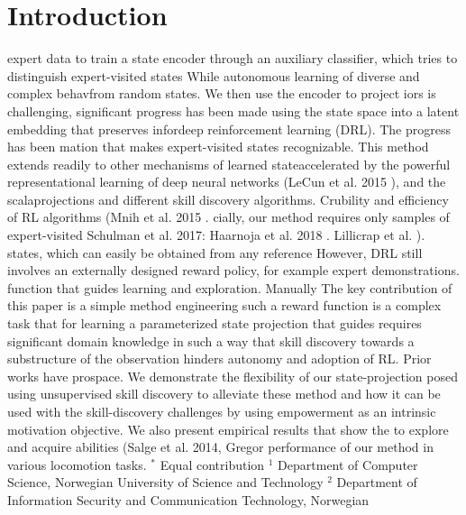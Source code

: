 \section{Introduction} expert data to train a state encoder through an auxiliary classifier, which tries to distinguish expert-visited states While autonomous learning of diverse and complex behavfrom random states. We then use the encoder to project iors is challenging, significant progress has been made using the state space into a latent embedding that preserves infordeep reinforcement learning (DRL). The progress has been mation that makes expert-visited states recognizable. This method extends readily to other mechanisms of learned stateaccelerated by the powerful representational learning of deep neural networks (LeCun et al. 2015 ), and the scalaprojections and different skill discovery algorithms. Crubility and efficiency of RL algorithms (Mnih et al. 2015 . cially, our method requires only samples of expert-visited Schulman et al. 2017: Haarnoja et al. 2018 . Lillicrap et al. ). states, which can easily be obtained from any reference However, DRL still involves an externally designed reward policy, for example expert demonstrations. function that guides learning and exploration. Manually The key contribution of this paper is a simple method engineering such a reward function is a complex task that for learning a parameterized state projection that guides requires significant domain knowledge in such a way that skill discovery towards a substructure of the observation hinders autonomy and adoption of RL. Prior works have prospace. We demonstrate the flexibility of our state-projection posed using unsupervised skill discovery to alleviate these method and how it can be used with the skill-discovery challenges by using empowerment as an intrinsic motivation objective. We also present empirical results that show the to explore and acquire abilities (Salge et al. 2014, Gregor performance of our method in various locomotion tasks. ${ }^{*}$ Equal contribution ${ }^{1}$ Department of Computer Science, Norwegian University of Science and Technology ${ }^{2}$ Department of Information Security and Communication Technology, Norwegian


